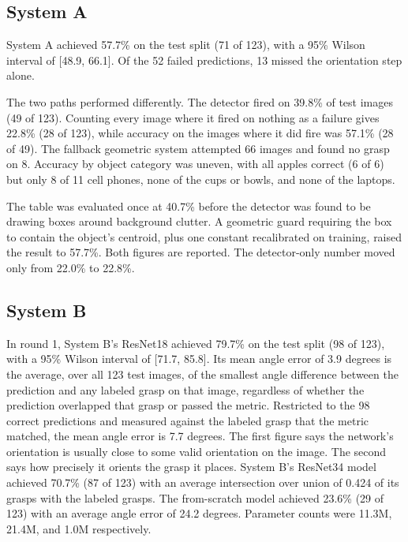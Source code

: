 \documentclass[12pt,letterpaper]{article}
\begin{document}
\subsection{System A}\label{sec:res-a}

System A achieved 57.7\% on the test split (71 of 123), with a 95\%
Wilson interval of [48.9, 66.1]. Of the 52 failed predictions, 13 missed
the orientation step alone.

The two paths performed differently. The detector fired on 39.8\% of
test images (49 of 123). Counting every image where it fired on nothing
as a failure gives 22.8\% (28 of 123), while accuracy on the images
where it did fire was 57.1\% (28 of 49). The fallback geometric system
attempted 66 images and found no grasp on 8. Accuracy by object category
was uneven, with all apples correct (6 of 6) but only 8 of 11 cell
phones, none of the cups or bowls, and none of the laptops.

The table was evaluated once at 40.7\% before the detector was found to
be drawing boxes around background clutter. A geometric guard requiring
the box to contain the object's centroid, plus one constant recalibrated
on training, raised the result to 57.7\%. Both figures are reported. The
detector-only number moved only from 22.0\% to 22.8\%.

\subsection{System B}\label{sec:res-b}

In round 1, System B's ResNet18 achieved 79.7\% on the test split (98 of
123), with a 95\% Wilson interval of [71.7, 85.8]. Its mean angle error
of 3.9 degrees is the average, over all 123 test images, of the smallest
angle difference between the prediction and any labeled grasp on that
image, regardless of whether the prediction overlapped that grasp or
passed the metric. Restricted to the 98 correct predictions and measured
against the labeled grasp that the metric matched, the mean angle error
is 7.7 degrees. The first figure says the network's orientation is
usually close to some valid orientation on the image. The second says
how precisely it orients the grasp it places. System B's ResNet34 model
achieved 70.7\% (87 of 123) with an average intersection over union of
0.424 of its grasps with the labeled grasps. The from-scratch model
achieved 23.6\% (29 of 123) with an average angle error of 24.2 degrees.
Parameter counts were 11.3M, 21.4M, and 1.0M respectively.
\end{document}
